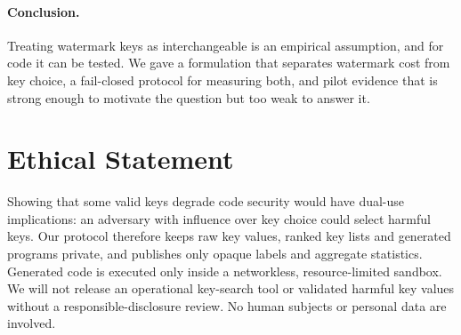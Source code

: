 \paragraph{Conclusion.} Treating watermark keys as interchangeable is an empirical assumption, and for code it can be tested. We gave a formulation that separates watermark cost from key choice, a fail-closed protocol for measuring both, and pilot evidence that is strong enough to motivate the question but too weak to answer it.

\section*{Ethical Statement}
Showing that some valid keys degrade code security would have dual-use implications: an adversary with influence over key choice could select harmful keys. Our protocol therefore keeps raw key values, ranked key lists and generated programs private, and publishes only opaque labels and aggregate statistics. Generated code is executed only inside a networkless, resource-limited sandbox. We will not release an operational key-search tool or validated harmful key values without a responsible-disclosure review. No human subjects or personal data are involved.
